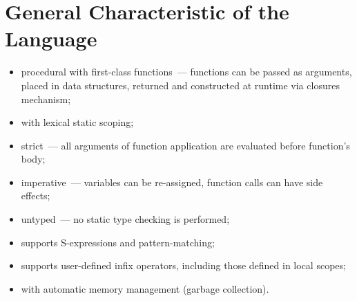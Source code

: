 \section{General Characteristic of the Language}

\begin{itemize}
\item procedural with first-class functions~--- functions can be passed as arguments, placed in data structures,
  returned and constructed at runtime via closures mechanism;
\item with lexical static scoping;
\item strict~--- all arguments of function application are evaluated before function's body;
\item imperative~--- variables can be re-assigned, function calls can have side effects;
\item untyped~--- no static type checking is performed;
\item supports S-expressions and pattern-matching;
\item supports user-defined infix operators, including those defined in local scopes;
\item with automatic memory management (garbage collection).
\end{itemize}
